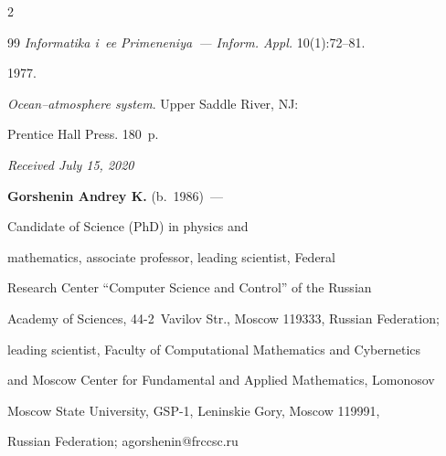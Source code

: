 \begin{multicols}{2}
{{\begin{thebibliography}{99}
\textit{Informatika i~ee Primeneniya~--- Inform. Appl.} 10(1):72--81.




 1977. 

\textit{Ocean--atmosphere system}. Upper Saddle River, NJ: 

Prentice Hall Press. 180~p.

\end{thebibliography}



 }

 }



\end{multicols}



\vspace*{-6pt}



\hfill{\small\textit{Received July 15, 2020}}









\Contr



\noindent

\textbf{Gorshenin Andrey K.} (b.\ 1986)~--- 

Candidate of Science (PhD) in physics and

mathematics, associate professor, leading scientist, Federal 

Research Center ``Computer Science and Control'' of the Russian 

Academy of Sciences, 44-2~Vavilov Str., Moscow 119333, Russian Federation; 

leading scientist, Faculty of Computational Mathematics and Cybernetics 

and Moscow Center for Fundamental and Applied Mathematics, Lomonosov 

Moscow State University, GSP-1, Leninskie Gory, Moscow 119991, 

Russian Federation; \mbox{agorshenin@frccsc.ru}



\vspace*{3pt}



